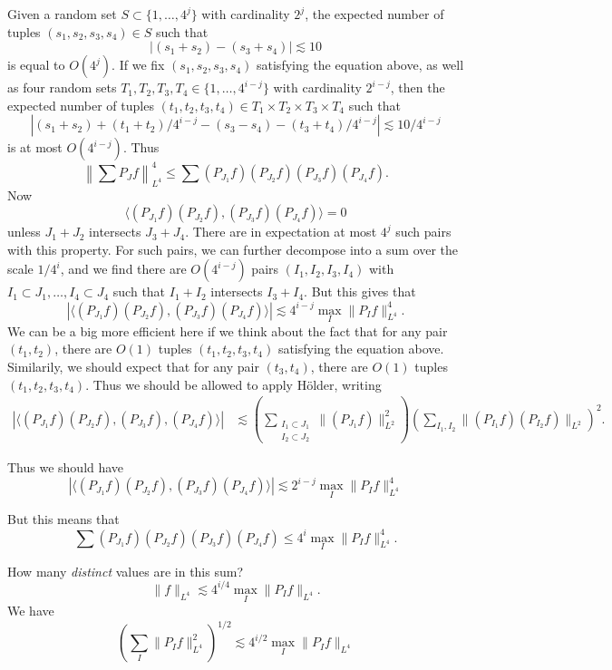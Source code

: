 \documentclass[dvipsnames,letterpaper,12pt]{article}
\numberwithin{equation}{section}
\numberwithin{theorem}{section}
\begin{document}
Given a random set $S \subset \{ 1, \dots, 4^j \}$ with cardinality $2^j$, the expected number of tuples $(s_1,s_2,s_3,s_4) \in S$ such that
%
\[ |(s_1 + s_2) - (s_3 + s_4)| \lesssim 10 \]
%
is equal to $O(4^j)$. If we fix $(s_1,s_2,s_3,s_4)$ satisfying the equation above, as well as four random sets $T_1,T_2,T_3,T_4 \in \{ 1, \dots, 4^{i-j} \}$ with cardinality $2^{i-j}$, then the expected number of tuples $(t_1,t_2,t_3,t_4) \in T_1 \times T_2 \times T_3 \times T_4$ such that
%
\[ |(s_1 + s_2) + (t_1 + t_2) / 4^{i-j} - (s_3 - s_4) - (t_3 + t_4) / 4^{i-j}| \lesssim 10/4^{i-j} \]
%
is at most $O(4^{i-j})$. Thus
%
\[ \left\| \sum P_J f \right\|_{L^4}^4 \leq \sum (P_{J_1} f) (P_{J_2} f) (P_{J_3} f) (P_{J_4} f). \]
%
Now
%
\[ \langle (P_{J_1} f) (P_{J_2} f), (P_{J_3} f) (P_{J_4} f) \rangle = 0 \]
%
unless $J_1 + J_2$ intersects $J_3 + J_4$. There are in expectation at most $4^j$ such pairs with this property. For such pairs, we can further decompose into a sum over the scale $1/4^i$, and we find there are $O(4^{i-j})$ pairs $(I_1,I_2,I_3,I_4)$ with $I_1 \subset J_1,\dots, I_4 \subset J_4$ such that $I_1 + I_2$ intersects $I_3 + I_4$. But this gives that
%
\[ |\langle (P_{J_1} f) (P_{J_2} f), (P_{J_3} f) (P_{J_4} f) \rangle| \lesssim 4^{i-j} \max_I \| P_I f \|_{L^4}^4. \]
%
We can be a big more efficient here if we think about the fact that for any pair $(t_1,t_2)$, there are $O(1)$ tuples $(t_1,t_2,t_3,t_4)$ satisfying the equation above. Similarily, we should expect that for any pair $(t_3,t_4)$, there are $O(1)$ tuples $(t_1,t_2,t_3,t_4)$. Thus we should be allowed to apply H\"{o}lder, writing
%
\begin{align*}
    |\langle (P_{J_1} f) (P_{J_2} f), (P_{J_3} f), (P_{J_4} f) \rangle| &\lesssim \left( \sum_{\substack{I_1 \subset J_1\\I_2 \subset J_2}} \| (P_{J_1} f)  \|_{L^2}^2 \right) \left( \sum_{I_1,I_2} \| (P_{I_1} f) (P_{I_2} f) \|_{L^2} \right)^2.
\end{align*}

Thus we should have
%
\[ |\langle (P_{J_1} f) (P_{J_2} f), (P_{J_3} f) (P_{J_4} f) \rangle| \lesssim 2^{i-j} \max_I \| P_I f \|_{L^4}^4 \]

But this means that
%
\[ \sum (P_{J_1} f) (P_{J_2} f) (P_{J_3} f) (P_{J_4} f) \leq 4^i \max_I \| P_I f \|_{L^4}^4. \]
%

How many \emph{distinct} values are in this sum?
%
\[ \| f \|_{L^4} \lesssim 4^{i/4} \max_I \| P_I f \|_{L^4}. \]
%
We have
%
\[ \left( \sum_I \| P_I f \|_{L^4}^2 \right)^{1/2} \lesssim 4^{i/2} \max_I \| P_I f \|_{L^4} \]
\end{document}
